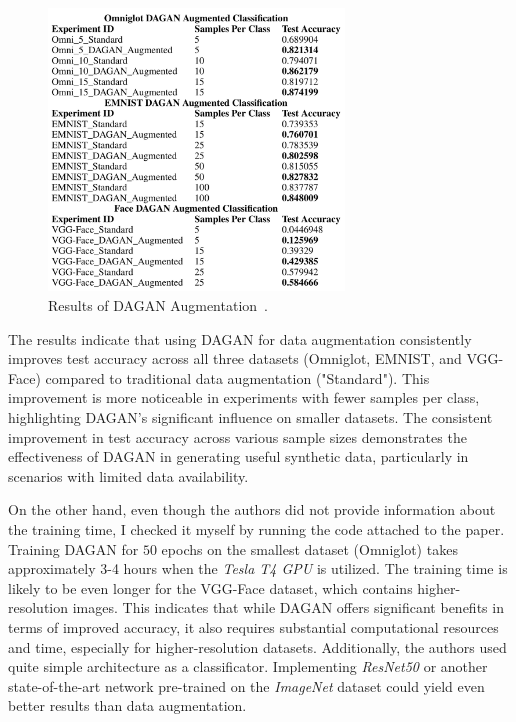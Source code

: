 \begin{figure}[!h]
    \centering
    \includegraphics[width=0.7\textwidth]{Images/dagan_results.png}
    \caption{Results of DAGAN Augmentation~\cite{DAGANPaper}.}
    \label{fig:daganResults}
\end{figure}

The results indicate that using DAGAN for data augmentation consistently improves test accuracy across all three datasets (Omniglot, EMNIST, and VGG-Face) compared to traditional data augmentation ("Standard"). This improvement is more noticeable in experiments with fewer samples per class, highlighting DAGAN's significant influence on smaller datasets. The consistent improvement in test accuracy across various sample sizes demonstrates the effectiveness of DAGAN in generating useful synthetic data, particularly in scenarios with limited data availability.

On the other hand, even though the authors did not provide information about the training time, I checked it myself by running the code attached to the paper. Training DAGAN for $50$ epochs on the smallest dataset (Omniglot) takes approximately 3-4 hours when the \textit{Tesla T4 GPU} is utilized. The training time is likely to be even longer for the VGG-Face dataset, which contains higher-resolution images. This indicates that while DAGAN offers significant benefits in terms of improved accuracy, it also requires substantial computational resources and time, especially for higher-resolution datasets. Additionally, the authors used quite simple architecture as a classificator. Implementing \textit{ResNet50} or another state-of-the-art network pre-trained on the \textit{ImageNet} dataset could yield even better results than data augmentation.

